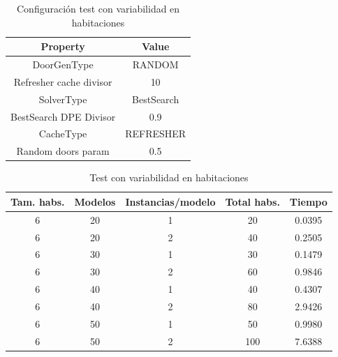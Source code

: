 \begin{table}[H]
\begin{center}
	\begin{tabular}{ | c | c | }
\hline
 		Property & Value \\ \hline
DoorGenType & RANDOM \\ 
Refresher cache divisor & 10 \\ 
SolverType & BestSearch \\ 
BestSearch DPE Divisor & 0.9 \\ 
CacheType & REFRESHER \\ 
Random doors param & 0.5 \\ 
\hline
	\end{tabular}
\end{center}
\caption{Configuración test con variabilidad en habitaciones}
\label{table:cfg-optvarsample}
\end{table}


\begin{table}[H]
\begin{center}
	\begin{tabular}{ | c | c | c | c | c | }
\hline
Tam. habs. & Modelos & Instancias/modelo & Total habs. & Tiempo \\ \hline 
6 & 20 & 1 & 20 & 0.0395 \\ 
6 & 20 & 2 & 40 & 0.2505 \\ 
6 & 30 & 1 & 30 & 0.1479 \\ 
6 & 30 & 2 & 60 & 0.9846 \\ 
6 & 40 & 1 & 40 & 0.4307 \\ 
6 & 40 & 2 & 80 & 2.9426 \\ 
6 & 50 & 1 & 50 & 0.9980 \\ 
6 & 50 & 2 & 100 & 7.6388 \\ 
\hline
	\end{tabular}
\end{center}
\caption{Test con variabilidad en habitaciones}
\label{table:optvarsample}
\end{table}


